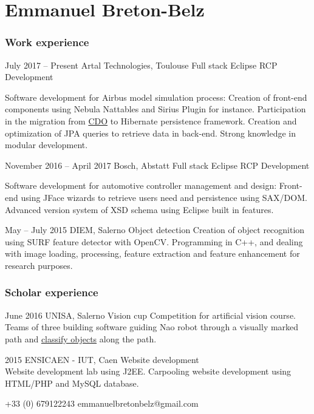 \documentclass{tccv-master/tccv}
\begin{document}
\part{Emmanuel Breton-Belz}

\section{Work experience}

\begin{eventlist}

\item{July 2017 -- Present}
     {Artal Technologies, Toulouse}
     {Full stack Eclipse RCP Development}

Software development for Airbus model simulation process: Creation of 
front-end components using Nebula Nattables and Sirius Plugin for instance.
Participation in the migration from \href{https://www.eclipse.org/cdo/}{CDO} to Hibernate
persistence framework. Creation and optimization of JPA queries to retrieve 
data in back-end. Strong knowledge in modular development.

\item{November 2016 -- April 2017}
     {Bosch, Abstatt}
     {Full stack Eclipse RCP Development}

Software development for automotive controller management and design:
Front-end using JFace wizards to retrieve users need and persistence using 
SAX/DOM. Advanced version system of XSD schema using Eclipse built in
features.

\item{May -- July 2015}
     {DIEM, Salerno}
     {Object detection}
Creation of object recognition using SURF feature detector with OpenCV.
Programming in C++, and dealing with image loading, processing, feature extraction
and feature enhancement for research purposes.

\end{eventlist}

\section{Scholar experience}

\begin{eventlist}
\item{June 2016}
{UNISA, Salerno}
     {Vision cup}
Competition for artificial vision course. Teams of three building software guiding 
Nao robot through a visually marked path and \href{https://github.com/manumanmax/Nao}{classify objects} along the path.

\item{2015}
{ENSICAEN - IUT, Caen}
     {Website development} \\
Website development lab using J2EE.
Carpooling website development using HTML/PHP and MySQL database.

\end{eventlist}
    {+33 (0) 679122243}
    {emmanuelbretonbelz@gmail.com}
\end{document}
